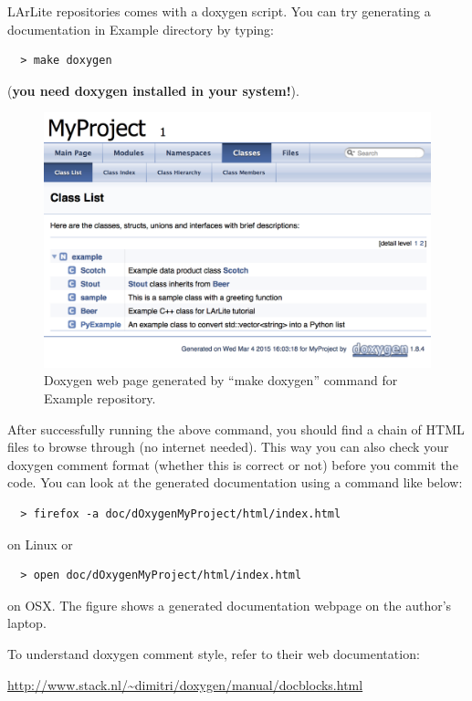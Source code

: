 LArLite repositories comes with a doxygen script. You can try generating a documentation
in {\ttfamily Example} directory by typing:
\begin{lstlisting}
  > make doxygen
\end{lstlisting}
({\bf you need doxygen installed in your system!}).

\begin{figure}[htb]\begin{center}
\includegraphics[width=12cm]{./img/doxygen.pdf}
\caption{ 
Doxygen web page generated by ``{\ttfamily make doxygen}'' command for {\ttfamily Example} repository.
}
\end{center}\end{figure}

After successfully running the above command, you should find a chain of HTML files 
to browse through (no internet needed). This way you can also check your doxygen comment
format (whether this is correct or not) before you commit the code. You can look at the
generated documentation using a command like below:
\begin{lstlisting}
  > firefox -a doc/dOxygenMyProject/html/index.html 
\end{lstlisting}
on {\ttfamily Linux} or
\begin{lstlisting}
  > open doc/dOxygenMyProject/html/index.html 
\end{lstlisting}
on {\ttfamily OSX}. The figure shows a generated documentation webpage on the author's laptop.

To understand {\ttfamily doxygen} comment style, refer to their web documentation:
\begin{center}
{\color{blue}\url{http://www.stack.nl/~dimitri/doxygen/manual/docblocks.html}}
\end{center}
